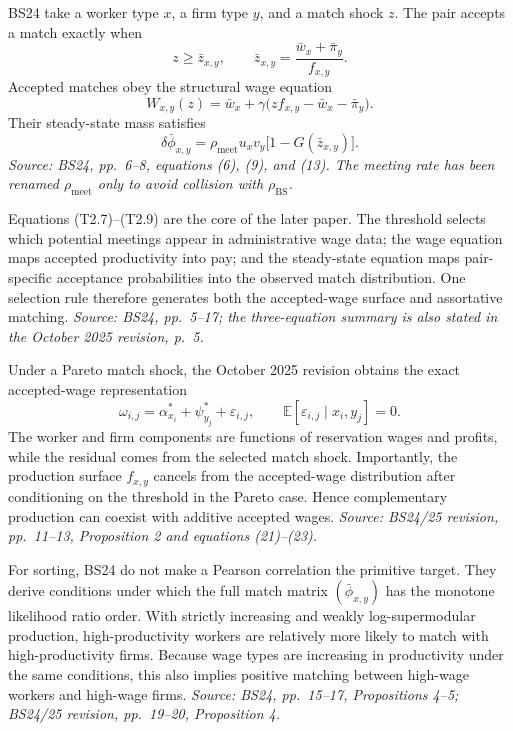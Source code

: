 \documentclass[11pt]{article}
\begin{document}
BS24 take a worker type \(x\), a firm type \(y\), and a match shock \(z\).
The pair accepts a match exactly when
\[
z\geq\bar z_{x,y},
\qquad
\bar z_{x,y}
=
\frac{\bar w_x+\bar\pi_y}{f_{x,y}}.
\tag{T2.7}
\]
Accepted matches obey the structural wage equation
\[
W_{x,y}(z)
=
\bar w_x
+\gamma\bigl(zf_{x,y}-\bar w_x-\bar\pi_y\bigr).
\tag{T2.8}
\]
Their steady-state mass satisfies
\[
\delta\bar\phi_{x,y}
=
\rho_{\mathrm{meet}}u_xv_y
\bigl[1-G(\bar z_{x,y})\bigr].
\tag{T2.9}
\]
\textit{Source: BS24, pp.\ 6--8, equations (6), (9), and (13).  The meeting
rate has been renamed \(\rho_{\mathrm{meet}}\) only to avoid collision with
\(\rho_{\mathrm{BS}}\).}

Equations (T2.7)--(T2.9) are the core of the later paper.  The threshold
selects which potential meetings appear in administrative wage data; the wage
equation maps accepted productivity into pay; and the steady-state equation
maps pair-specific acceptance probabilities into the observed match
distribution.  One selection rule therefore generates both the accepted-wage
surface and assortative matching.
\textit{Source: BS24, pp.\ 5--17; the three-equation summary is also stated in
the October 2025 revision, p.\ 5.}

Under a Pareto match shock, the October 2025 revision obtains the exact
accepted-wage representation
\[
\omega_{i,j}
=
\alpha_{x_i}^*
+\psi_{y_j}^*
+\varepsilon_{i,j},
\qquad
\mathbb E[\varepsilon_{i,j}\mid x_i,y_j]=0.
\tag{T2.10}
\]
The worker and firm components are functions of reservation wages and profits,
while the residual comes from the selected match shock.  Importantly, the
production surface \(f_{x,y}\) cancels from the accepted-wage distribution
after conditioning on the threshold in the Pareto case.  Hence complementary
production can coexist with additive accepted wages.
\textit{Source: BS24/25 revision, pp.\ 11--13, Proposition 2 and
equations (21)--(23).}

For sorting, BS24 do not make a Pearson correlation the primitive target.
They derive conditions under which the full match matrix
\((\bar\phi_{x,y})\) has the monotone likelihood ratio order.  With strictly
increasing and weakly log-supermodular production, high-productivity workers
are relatively more likely to match with high-productivity firms.  Because
wage types are increasing in productivity under the same conditions, this
also implies positive matching between high-wage workers and high-wage firms.
\textit{Source: BS24, pp.\ 15--17, Propositions 4--5; BS24/25 revision,
pp.\ 19--20, Proposition 4.}
\end{document}
